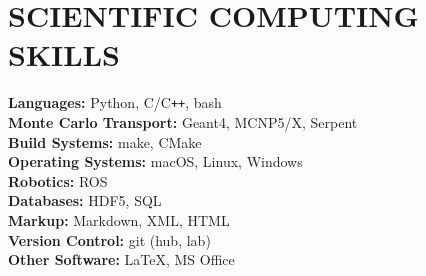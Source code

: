 \section{\small{SCIENTIFIC COMPUTING \\ SKILLS}}

\textbf{Languages:} \hfill Python, C/C\verb!++!, bash\\
\textbf{Monte Carlo Transport:} \hfill Geant4, MCNP5/X, Serpent\\
\textbf{Build Systems:} \hfill make, CMake\\
\textbf{Operating Systems:} \hfill macOS, Linux, Windows\\
\textbf{Robotics:} \hfill ROS\\
\textbf{Databases:} \hfill HDF5, SQL\\
\textbf{Markup:} \hfill Markdown, XML, HTML\\
\textbf{Version Control:} \hfill git (hub, lab)\\
\textbf{Other Software:} \hfill \LaTeX, MS Office

%
